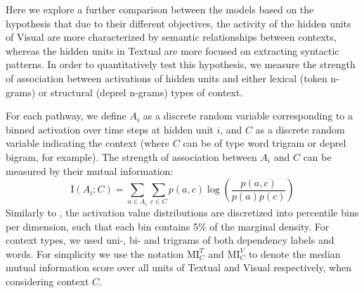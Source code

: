 %
%
%
%
%

Here we explore a further comparison between the
models based on the hypothesis that due to their different objectives,
the activity of the hidden units of {\sc Visual} are more
characterized by semantic relationships between contexts, whereas the
hidden units in {\sc Textual} are more focused on extracting syntactic
patterns. In order to quantitatively test this hypothesis, we measure the strength
of association between activations of hidden units and either lexical
(token n-grams) or structural (deprel n-grams) types of context.

For each pathway, we define $A_i$ as a discrete random variable corresponding 
to a binned activation over time steps at hidden unit $i$, and $C$ 
as a discrete random variable indicating the context 
(where $C$ can be of type word trigram or deprel bigram, for example). 
The strength of association between $A_i$ and $C$ can be measured 
by their mutual information:
\[
\mathrm{I}(A_i;C) = \sum_{a\in{A_i}}\sum_{c\in{C}} p(a,c)\log\left(\frac{p(a,c)}{p(a)p(c)}\right) 
\]
Similarly to , the activation value distributions are discretized 
into percentile bins per dimension, such that each bin contains 5\% of the marginal 
density. For context types, we used uni-, bi- and trigrams of both dependency labels 
and words. For simplicity we use the notation $\mathrm{MI}^T_C$ and  $\mathrm{MI}^V_C$ 
to denote the median mutual information score over all units of {\sc Textual} and {\sc Visual} 
respectively, when considering context $C$. 

